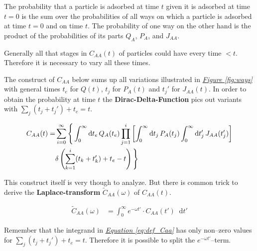 \documentclass[a4paper, parskip=half]{scrartcl}
\newcommand{\effect}[1]{%
	\textbf{#1}%
}
\newcommand{\diff}{\mathop{}\!\mathrm{d}}
\newcommand{\myFigRef}[1]{\textit{\hyperref[#1]{Figure \ref*{#1}}}}
\newcommand{\myEqRef}[1]{\textit{\hyperref[eq:#1]{Equation \ref*{eq:#1}}}}
\newcommand{\myEqLabel}[1]{\label{eq:#1}}
\begin{document}
The probability that a particle is adsorbed at time $t$ given it is adsorbed at time $t=0$ is the sum over the probabilities of all ways on which a particle is adsorbed at time $t=0$ and on time $t$. The probability of one way on the other hand is the product of the probabilities of its parts $Q_A$, $P_A$, and $J_{AA}$.

Generally all that stages in $C_{AA}(t)$ of particles could have every time $<t$. Therefore it is necessary to vary all these times. 

The construct of $C_{AA}$ below sums up all variations illustrated in \myFigRef{fig:ways} with general times $t_e$ for $Q(t)$, $t_j$ for $P_A(t)$ and $t_j'$ for $J_{AA}(t)$. In order to obtain the probability at time $t$ the \effect{Dirac-Delta-Function} pics out variants with $\sum_{j} (t_j+t_j') + t_e = t$.

\begin{align}
C_{AA}(t) = &\sum_{i=0}^\infty \Bigg\lbrace \int_0^\infty \diff t_e\, Q_A(t_e) \prod_{j=1}^i \left[ \int_0^\infty \diff t_j\, P_A(t_j) \int_0^\infty \diff t_j'\, J_{AA}(t_j')\right]\notag\\ 
&\delta \left(\sum_{k=1}^i(t_k+t_k') + t_e - t \right) \Bigg\rbrace \myEqLabel{def_Caa}
\end{align}

This construct itself is very though to analyze. But there is common trick to derive the \effect{Laplace-transform} $\widetilde{C}_{AA}(\omega)$ of $C_{AA}(t)$.

\begin{align}
\widetilde{C}_{AA}(\omega) &= \int_0^\infty e^{-\omega t'} \cdot C_{AA}(t') \diff t'
\end{align}

Remember that the integrand in \myEqRef{def_Caa} has only non--zero values for $\sum_{j} (t_j+t_j') + t_e = t$. Therefore it is possible to split the $e^{-\omega t'}$--term.
\end{document}
